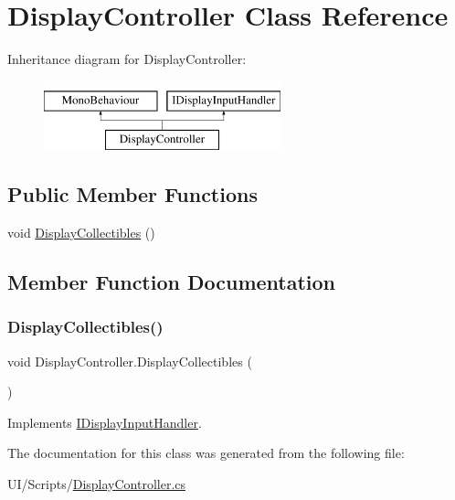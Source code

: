 \hypertarget{class_display_controller}{}\section{Display\+Controller Class Reference}
\label{class_display_controller}
Inheritance diagram for Display\+Controller\+:\begin{figure}[H]
\begin{center}
\leavevmode
\includegraphics[height=2.000000cm]{class_display_controller}
\end{center}
\end{figure}
\subsection*{Public Member Functions}
\begin{DoxyCompactItemize}
\item 
void \mbox{\hyperlink{class_display_controller_a71f4cddb6e50da01995d87e9f21c9869}{Display\+Collectibles}} ()
\end{DoxyCompactItemize}


\subsection{Member Function Documentation}
\mbox{\label{class_display_controller_a71f4cddb6e50da01995d87e9f21c9869}} 
\subsubsection{\texorpdfstring{Display\+Collectibles()}{DisplayCollectibles()}}
{\footnotesize\ttfamily void Display\+Controller.\+Display\+Collectibles (\begin{DoxyParamCaption}{ }\end{DoxyParamCaption})}



Implements \mbox{\hyperlink{interface_i_display_input_handler_a0f2bb113d10f097e671d9fa99a18bf08}{I\+Display\+Input\+Handler}}.



The documentation for this class was generated from the following file\+:\begin{DoxyCompactItemize}
\item 
U\+I/\+Scripts/\mbox{\hyperlink{_display_controller_8cs}{Display\+Controller.\+cs}}\end{DoxyCompactItemize}
